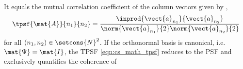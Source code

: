 It equals
the mutual correlation coefficient of
the column vectors given by
\cite[(23)]{article:ProvostITMI2009},
\cite[(2)]{article:LustigMRM2007}
\begin{equation}
  \tpsf{ \mat{A} }{ n_{1} }{ n_{2} }
  =
  \frac{
    \inprod{ \vect{a}_{ n_{1} } }{ \vect{a}_{ n_{2} } }
  }{
    \norm{ \vect{a}_{ n_{1} } }{2}
    \norm{ \vect{a}_{ n_{2} } }{2}
  }
 \label{eqn:cs_math_tpsf}
\end{equation}
for
all $( n_{1}, n_{2} ) \in \setcons{ N }^{2}$.
If
the orthonormal basis is
canonical, i.e.
$\mat{\Psi} = \mat{I}$,
the \ac{TPSF}
\eqref{eqn:cs_math_tpsf} reduces to
the \ac{PSF} and exclusively quantifies
the coherence of
